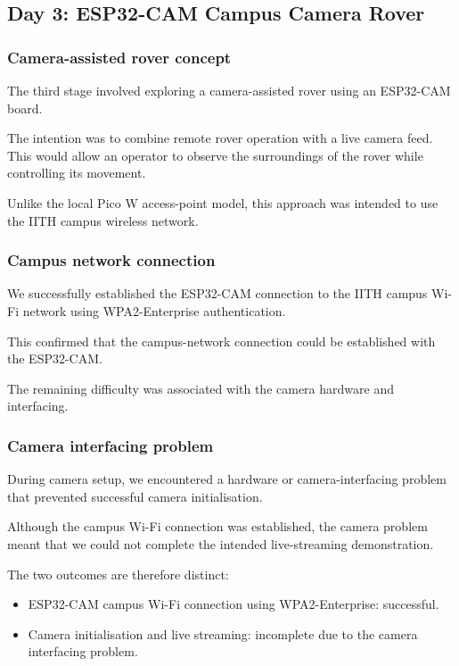 \documentclass[11pt,a4paper]{article}
\begin{document}
\subsection{Day 3: ESP32-CAM Campus Camera Rover}

\subsubsection{Camera-assisted rover concept}

The third stage involved exploring a camera-assisted
rover using an ESP32-CAM board.

The intention was to combine remote rover operation
with a live camera feed. This would allow an operator
to observe the surroundings of the rover while
controlling its movement.

Unlike the local Pico W access-point model, this
approach was intended to use the IITH campus
wireless network.


\subsubsection{Campus network connection}

We successfully established the ESP32-CAM connection
to the IITH campus Wi-Fi network using WPA2-Enterprise
authentication.

This confirmed that the campus-network connection
could be established with the ESP32-CAM.

The remaining difficulty was associated with the
camera hardware and interfacing.


\subsubsection{Camera interfacing problem}

During camera setup, we encountered a hardware or
camera-interfacing problem that prevented successful
camera initialisation.

Although the campus Wi-Fi connection was established,
the camera problem meant that we could not complete
the intended live-streaming demonstration.

The two outcomes are therefore distinct:

\begin{itemize}
    \item ESP32-CAM campus Wi-Fi connection using
    WPA2-Enterprise: successful.
    \item Camera initialisation and live streaming:
    incomplete due to the camera interfacing problem.
\end{itemize}
\end{document}
